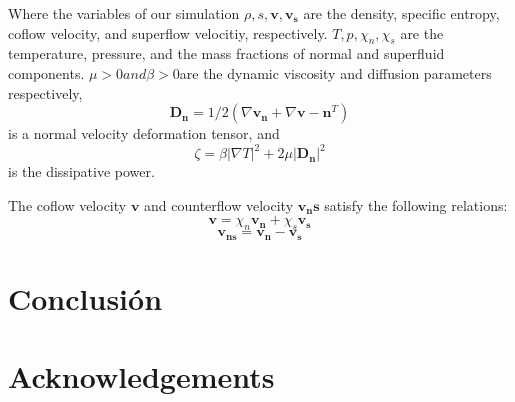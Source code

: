 \documentclass{article}
\begin{document}
Where the variables of our simulation  \(\rho, s, \mathbf{v}, \mathbf{v_s}\) are the density, specific entropy, coflow velocity, and superflow velocitiy, respectively.
\(T, p, \chi_n, \chi_s\) are the temperature, pressure, and the mass fractions of normal and superfluid components. 
\(\mu > 0 and \beta>0 \)are the dynamic viscosity and diffusion parameters respectively, 
\[\mathbf{D_n} = 1/2(\nabla \mathbf{v_n} +  \nabla \mathbf{v-n}^T)\] 
is a normal velocity deformation tensor, and
\[\zeta = \beta |\nabla T|^2 + 2 \mu |\mathbf{D_n}|^2\]
is the dissipative power.


The coflow velocity \(\mathbf{v}\) and counterflow velocity \( \mathbf{v_ns}\) satisfy the following relations:
\[\mathbf{v} = \chi_n \mathbf{v_n} + \chi_s \mathbf{v_s}\]
\[\mathbf{v_{ns}}  = \mathbf{v_n} - \mathbf{v_s}\]

\section{Conclusión}


 
\section{Acknowledgements}


\

\end{document}
